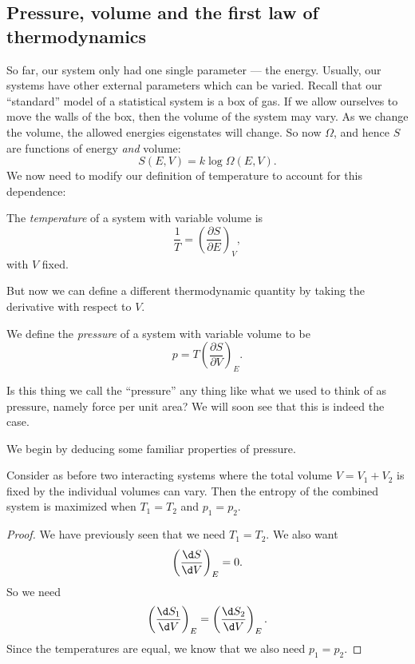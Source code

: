 \documentclass[a4paper]{article}
\begin{document}
\subsection{Pressure, volume and the first law of thermodynamics}
So far, our system only had one single parameter --- the energy. Usually, our systems have other external parameters which can be varied. Recall that our ``standard'' model of a statistical system is a box of gas. If we allow ourselves to move the walls of the box, then the volume of the system may vary. As we change the volume, the allowed energies eigenstates will change. So now $\Omega$, and hence $S$ are functions of energy \emph{and} volume:
\[
  S(E, V) = k \log \Omega(E, V).
\]
We now need to modify our definition of temperature to account for this dependence:
\begin{defi}[Temperature]
  The \emph{temperature} of a system with variable volume is
  \[
    \frac{1}{T} = \left(\frac{\partial S}{\partial E}\right)_V,
  \]
  with $V$ fixed.
\end{defi}

But now we can define a different thermodynamic quantity by taking the derivative with respect to $V$.

\begin{defi}[Pressure]
  We define the \emph{pressure} of a system with variable volume to be
  \[
    p = T \left(\frac{\partial S}{\partial V}\right)_E.
  \]
\end{defi}
Is this thing we call the ``pressure'' any thing like what we used to think of as pressure, namely force per unit area? We will soon see that this is indeed the case.


We begin by deducing some familiar properties of pressure.
\begin{prop}
  Consider as before two interacting systems where the total volume $V = V_1 + V_2$ is fixed by the individual volumes can vary. Then the entropy of the combined system is maximized when $T_1 = T_2$ and $p_1 = p_2$.
\end{prop}

\begin{proof}
  We have previously seen that we need $T_1 = T_2$. We also want
  \[
    \left(\frac{\d S}{\d V}\right)_E = 0.
  \]
  So we need
  \[
    \left(\frac{\d S_1}{\d V}\right)_E = \left(\frac{\d S_2}{\d V}\right)_E.
  \]
  Since the temperatures are equal, we know that we also need $p_1 = p_2$.
\end{proof}
\end{document}
